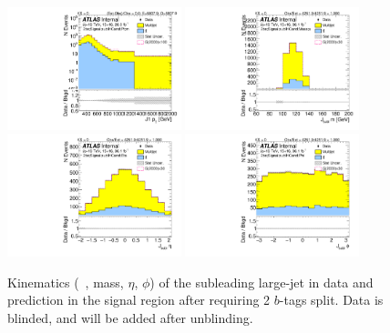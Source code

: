 \begin{figure}[htbp!]
\begin{center}
\includegraphics[width=0.45\textwidth,angle=-90]{figures/boosted/Signal/b77_TwoTag_split_Signal_sublHCand_Pt_m_1_blind.pdf}
\includegraphics[width=0.45\textwidth,angle=-90]{figures/boosted/Signal/b77_TwoTag_split_Signal_sublHCand_Mass_s_blind.pdf}\\
\includegraphics[width=0.45\textwidth,angle=-90]{figures/boosted/Signal/b77_TwoTag_split_Signal_sublHCand_Eta_blind.pdf}
\includegraphics[width=0.45\textwidth,angle=-90]{figures/boosted/Signal/b77_TwoTag_split_Signal_sublHCand_Phi_blind.pdf}
  \caption{Kinematics (\pt~, mass, $\eta$, $\phi$) of the subleading large-\R jet in data and prediction in the signal region after requiring 2 $b$-tags split. Data is blinded, and will be added after unblinding.}
  \label{fig:boosted-2bs-signal-blind-ak10-subl}
\end{center}
\end{figure}

